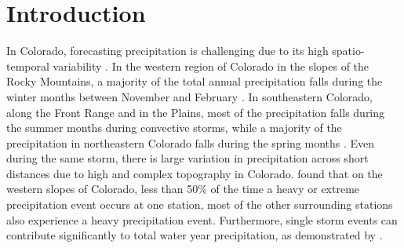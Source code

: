 \documentclass[draft]{agujournal2019}
\begin{document}
\section{Introduction}
\label{intro}

In Colorado, forecasting precipitation is challenging due to its high spatio-temporal variability \cite{Serreze2001CharacteristicsData, Cowie1986ColoradoAnalysis, Kirk2018LargeBasin, Lute2014RoleStates}. In the western region of Colorado in the slopes of the Rocky Mountains, a majority of the total annual precipitation falls during the winter months between November and February \cite{Doesken1984Period., Harvey2019CitizensFrom}. In southeastern Colorado, along the Front Range and in the Plains, most of the precipitation falls during the summer months during convective storms, while a majority of the precipitation in northeastern Colorado falls during the spring months \cite{Doesken1984Period., Harvey2019CitizensFrom}. Even during the same storm, there is large variation in precipitation across short distances due to high and complex topography in Colorado.  found that on the western slopes of Colorado, less than 50\% of the time a heavy or extreme precipitation event occurs at one station, most of the other surrounding stations also experience a heavy precipitation event. Furthermore, single storm events can contribute significantly to total water year precipitation, as demonstrated by .

\end{document}
